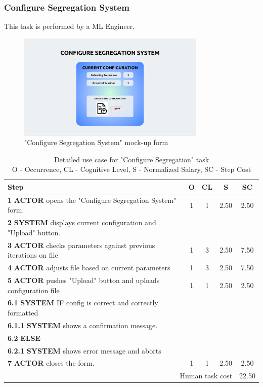\subsubsection{Configure Segregation System}

This task is performed by a ML Engineer.

\begin{figure}[H]
\centering
\includegraphics[width=0.8\textwidth]{figures/ui_configure_segregation.png}
\caption{"Configure Segregation System" mock-up form}
\end{figure}

\begin{table}[H]
\centering
\begin{tabularx}{\textwidth}{|X|c|c|c|c|}
\hline
\textbf{Step} & \textbf{O} & \textbf{CL} & \textbf{S} & \textbf{SC} \\
\hline
\textbf{1} \textbf{ACTOR} opens the "Configure Segregation System" form. &  1 & 1 & 2.50 & 2.50 \\
\hline
\textbf{2} \textbf{SYSTEM} displays current configuration and "Upload" button. & & & & \\
\hline
\textbf{3} \textbf{ACTOR} checks parameters against previous iterations on file & 1 & 3 & 2.50 & 7.50 \\
\hline
\textbf{4} \textbf{ACTOR} adjusts file based on current parameters & 1 & 3 & 2.50 & 7.50 \\
\hline
\textbf{5} \textbf{ACTOR} pushes "Upload" button and uploads configuration file & 1 & 1 & 2.50 & 2.50 \\
\hline
\textbf{6.1} \textbf{SYSTEM} IF config is correct and correctly formatted & & & & \\
\hline
\textbf{6.1.1} \textbf{SYSTEM} shows a confirmation message. & & & & \\
\hline
\textbf{6.2} \textbf{ELSE} & & & & \\
\hline
\textbf{6.2.1} \textbf{SYSTEM} shows error message and aborts & & & & \\
\hline
\textbf{7} \textbf{ACTOR} closes the form. & 1 & 1 & 2.50 & 2.50 \\
\hline
\multicolumn{4}{|r|}{Human task cost} & 22.50 \\
\hline
\end{tabularx}
\caption{Detailed use case for "Configure Segregation" task\\ 
O - Occurrence, CL - Cognitive Level, S - Normalized Salary, SC - Step Cost}
\label{table:configure_segregation_system}
\end{table}

